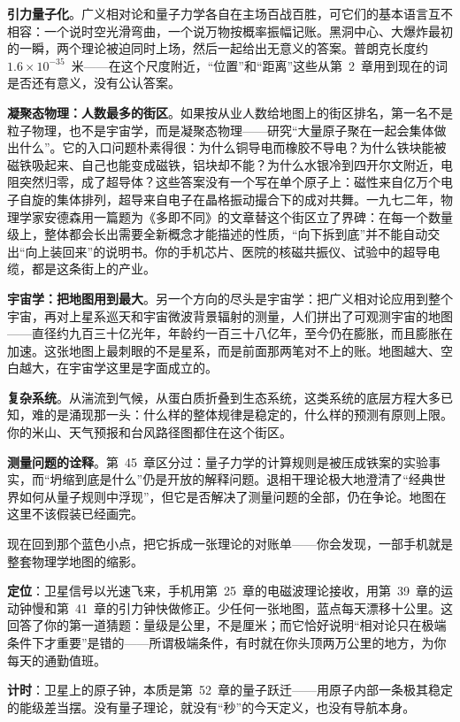 \textbf{引力量子化}。广义相对论和量子力学各自在主场百战百胜，可它们的基本语言互不相容：一个说时空光滑弯曲，一个说万物按概率振幅记账。黑洞中心、大爆炸最初的一瞬，两个理论被迫同时上场，然后一起给出无意义的答案。普朗克长度约 $1.6\times10^{-35}$~米——在这个尺度附近，“位置”和“距离”这些从第~2~章用到现在的词是否还有意义，没有公认答案。

\textbf{凝聚态物理：人数最多的街区}。如果按从业人数给地图上的街区排名，第一名不是粒子物理，也不是宇宙学，而是凝聚态物理——研究“大量原子聚在一起会集体做出什么”。它的入口问题朴素得很：为什么铜导电而橡胶不导电？为什么铁块能被磁铁吸起来、自己也能变成磁铁，铝块却不能？为什么水银冷到四开尔文附近，电阻突然归零，成了超导体？这些答案没有一个写在单个原子上：磁性来自亿万个电子自旋的集体排列，超导来自电子在晶格振动撮合下的成对共舞。一九七二年，物理学家安德森用一篇题为《多即不同》的文章替这个街区立了界碑：在每一个数量级上，整体都会长出需要全新概念才能描述的性质，“向下拆到底”并不能自动交出“向上装回来”的说明书。你的手机芯片、医院的核磁共振仪、试验中的超导电缆，都是这条街上的产业。

\textbf{宇宙学：把地图用到最大}。另一个方向的尽头是宇宙学：把广义相对论应用到整个宇宙，再对上星系巡天和宇宙微波背景辐射的测量，人们拼出了可观测宇宙的地图——直径约九百三十亿光年，年龄约一百三十八亿年，至今仍在膨胀，而且膨胀在加速。这张地图上最刺眼的不是星系，而是前面那两笔对不上的账。地图越大、空白越大，在宇宙学这里是字面成立的。

\textbf{复杂系统}。从湍流到气候，从蛋白质折叠到生态系统，这类系统的底层方程大多已知，难的是涌现那一头：什么样的整体规律是稳定的，什么样的预测有原则上限。你的米山、天气预报和台风路径图都住在这个街区。

\textbf{测量问题的诠释}。第~45~章区分过：量子力学的计算规则是被压成铁案的实验事实，而“坍缩到底是什么”仍是开放的解释问题。退相干理论极大地澄清了“经典世界如何从量子规则中浮现”，但它是否解决了测量问题的全部，仍在争论。地图在这里不该假装已经画完。


现在回到那个蓝色小点，把它拆成一张理论的对账单——你会发现，一部手机就是整套物理学地图的缩影。

\textbf{定位}：卫星信号以光速飞来，手机用第~25~章的电磁波理论接收，用第~39~章的运动钟慢和第~41~章的引力钟快做修正。少任何一张地图，蓝点每天漂移十公里。这回答了你的第一道猜题：量级是公里，不是厘米；而它恰好说明“相对论只在极端条件下才重要”是错的——所谓极端条件，有时就在你头顶两万公里的地方，为你每天的通勤值班。

\textbf{计时}：卫星上的原子钟，本质是第~52~章的量子跃迁——用原子内部一条极其稳定的能级差当摆。没有量子理论，就没有“秒”的今天定义，也没有导航本身。

